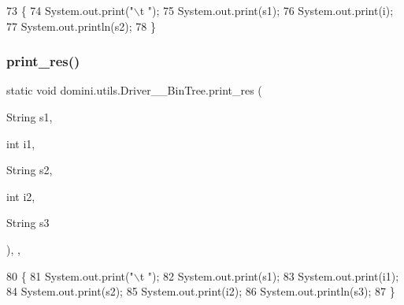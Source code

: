 \begin{DoxyCode}
73                                                                \{
74         System.out.print(\textcolor{stringliteral}{"\(\backslash\)t "});
75         System.out.print(s1);
76         System.out.print(i);
77         System.out.println(s2);
78     \}
\end{DoxyCode}
\mbox{\label{classdomini_1_1utils_1_1Driver____BinTree_a2d59fc46084a11fab2c22ce35c693f60}} 
\subsubsection{\texorpdfstring{print\+\_\+res()}{print\_res()}\hspace{0.1cm}{\footnotesize\ttfamily [2/2]}}
{\footnotesize\ttfamily static void domini.\+utils.\+Driver\+\_\+\+\_\+\+Bin\+Tree.\+print\+\_\+res (\begin{DoxyParamCaption}\item[{String}]{s1,  }\item[{int}]{i1,  }\item[{String}]{s2,  }\item[{int}]{i2,  }\item[{String}]{s3 }\end{DoxyParamCaption})\hspace{0.3cm}{\ttfamily [inline]}, {\ttfamily [static]}, {\ttfamily [private]}}


\begin{DoxyCode}
80                                                                                    \{
81         System.out.print(\textcolor{stringliteral}{"\(\backslash\)t "});
82         System.out.print(s1);
83         System.out.print(i1);
84         System.out.print(s2);
85         System.out.print(i2);
86         System.out.println(s3);
87     \}
\end{DoxyCode}
\mbox{\label{classdomini_1_1utils_1_1Driver____BinTree_a0d90bf2cb928174547e712140b5a4fe5}} 
